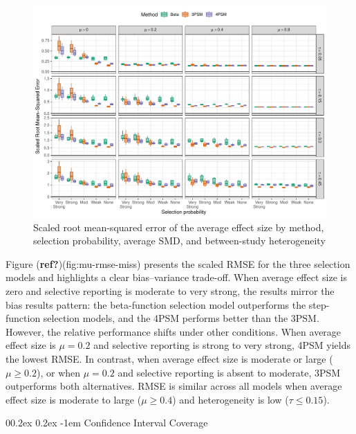 \documentclass[
  american,
  man, donotrepeattitle,floatsintext]{apa7}
\makeatletter
\let\oldparagraph\paragraph
\renewcommand{\paragraph}{
    \@ifstar
      \xxxParagraphStar
      \xxxParagraphNoStar
  }
\newcommand{\xxxParagraphStar}[1]{\oldparagraph*{#1}\mbox{}}
\newcommand{\xxxParagraphNoStar}[1]{\oldparagraph{#1}\mbox{}}
\renewcommand{\paragraph}{\@startsection{paragraph}{4}{\parindent}%
  {0\baselineskip \@plus 0.2ex \@minus 0.2ex}%
  {-1em}%
  {\normalfont\normalsize\bfseries\itshape\typesectitle}}
\makeatother
\begin{document}
\begin{figure}
\includegraphics{beta-function-selection-models-with-dependent-effects_files/figure-latex/mu-rmse-main-miss-1} \caption{Scaled root mean-squared error of the average effect size by method, selection probability, average SMD, and between-study heterogeneity}\label{fig:mu-rmse-main-miss}
\end{figure}

Figure (\textbf{ref?})(fig:mu-rmse-miss) presents the scaled RMSE for the three selection models and highlights a clear bias--variance trade-off. When average effect size is zero and selective reporting is moderate to very strong, the results mirror the bias results pattern: the beta-function selection model outperforms the step-function selection models, and the 4PSM performs better than the 3PSM. However, the relative performance shifts under other conditions. When average effect size is \(\mu = 0.2\) and selective reporting is strong to very strong, 4PSM yields the lowest RMSE. In contrast, when average effect size is moderate or large (\(\mu \geq 0.2\)), or when \(\mu = 0.2\) and selective reporting is absent to moderate, 3PSM outperforms both alternatives. RMSE is similar across all models when average effect size is moderate to large (\(\mu \geq 0.4\)) and heterogeneity is low (\(\tau \leq 0.15\)).

\paragraph{Confidence Interval Coverage}\label{confidence-interval-coverage-1}
\end{document}

